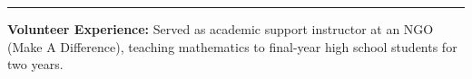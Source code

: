 \documentclass[a4paper,10pt]{article}
\begin{document}
\rule{18cm}{0.6pt}

\textbf{Volunteer Experience:} Served as academic support instructor at an NGO (Make A Difference), teaching mathematics to final-year high school students for two years.
\vfill
\end{document}
